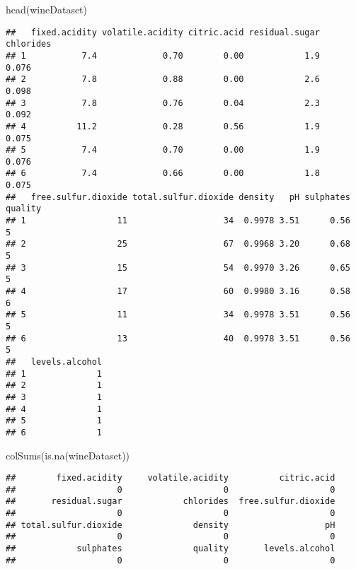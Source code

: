 \documentclass[
]{article}
\newenvironment{Shaded}{\begin{snugshade}}{\end{snugshade}}
\newcommand{\FunctionTok}[1]{\textcolor[rgb]{0.00,0.00,0.00}{#1}}
\newcommand{\NormalTok}[1]{#1}
\begin{document}
\begin{Shaded}
\begin{Highlighting}[]
\FunctionTok{head}\NormalTok{(wineDataset)}
\end{Highlighting}
\end{Shaded}

\begin{verbatim}
##   fixed.acidity volatile.acidity citric.acid residual.sugar chlorides
## 1           7.4             0.70        0.00            1.9     0.076
## 2           7.8             0.88        0.00            2.6     0.098
## 3           7.8             0.76        0.04            2.3     0.092
## 4          11.2             0.28        0.56            1.9     0.075
## 5           7.4             0.70        0.00            1.9     0.076
## 6           7.4             0.66        0.00            1.8     0.075
##   free.sulfur.dioxide total.sulfur.dioxide density   pH sulphates quality
## 1                  11                   34  0.9978 3.51      0.56       5
## 2                  25                   67  0.9968 3.20      0.68       5
## 3                  15                   54  0.9970 3.26      0.65       5
## 4                  17                   60  0.9980 3.16      0.58       6
## 5                  11                   34  0.9978 3.51      0.56       5
## 6                  13                   40  0.9978 3.51      0.56       5
##   levels.alcohol
## 1              1
## 2              1
## 3              1
## 4              1
## 5              1
## 6              1
\end{verbatim}

\begin{Shaded}
\begin{Highlighting}[]
\FunctionTok{colSums}\NormalTok{(}\FunctionTok{is.na}\NormalTok{(wineDataset))}
\end{Highlighting}
\end{Shaded}

\begin{verbatim}
##        fixed.acidity     volatile.acidity          citric.acid 
##                    0                    0                    0 
##       residual.sugar            chlorides  free.sulfur.dioxide 
##                    0                    0                    0 
## total.sulfur.dioxide              density                   pH 
##                    0                    0                    0 
##            sulphates              quality       levels.alcohol 
##                    0                    0                    0
\end{verbatim}
\end{document}
